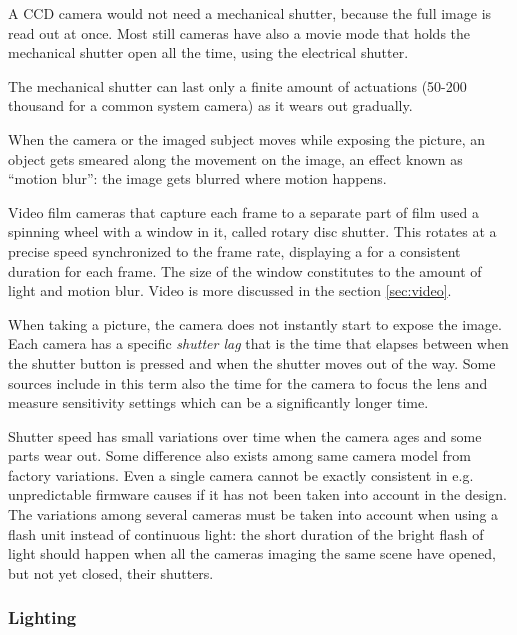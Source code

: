 A CCD camera would not need a mechanical shutter, because the full image is read out at once.
Most still cameras have also a movie mode that holds the mechanical shutter open all the time, using the electrical shutter.

The mechanical shutter can last only a finite amount of actuations (50-200 thousand for a common system camera) as it wears out gradually.

%



When the camera or the imaged subject moves while exposing the picture, an object gets smeared along the movement on the image, an effect known as ``motion blur'': the image gets blurred where motion happens.

Video film cameras that capture each frame to a separate part of film used a spinning wheel with a window in it, called rotary disc shutter. \cite{wilson2004anton}
This rotates at a precise speed synchronized to the frame rate, displaying a for a consistent duration for each frame.
The size of the window constitutes to the amount of light and motion blur. Video is more discussed in the section \ref{sec:video}.

When taking a picture, the camera does not instantly start to expose the image.
Each camera has a specific \emph{shutter lag} that is the time that elapses between when the shutter button is pressed and when the shutter moves out of the way.
Some sources include in this term also the time for the camera to focus the lens and measure sensitivity settings which can be a significantly longer time.

Shutter speed has small variations over time when the camera ages and some parts wear out.
Some difference also exists among same camera model from factory variations.
Even a single camera cannot be exactly consistent in e.g. unpredictable firmware causes if it has not been taken into account in the design.
The variations among several cameras must be taken into account when using a flash unit instead of continuous light: the short duration of the bright flash of light should happen when all the cameras imaging the same scene have opened, but not yet closed, their shutters.



\subsubsection{Lighting} %

